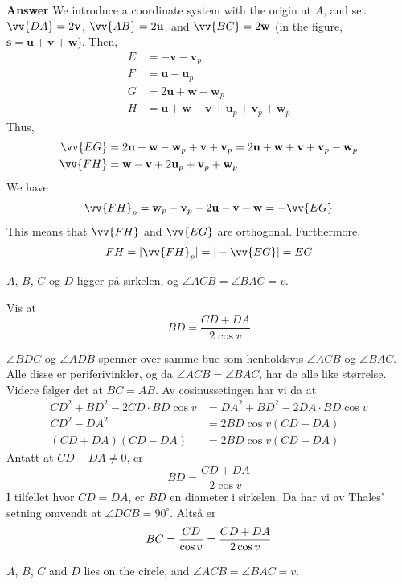 \documentclass[english,oneside, hidelinks, 11 pt, class=report,crop=false]{standalone}
\begin{document}
\textbf{Answer}
We introduce a coordinate system with the origin at $A$, and set $\vv{DA} = 2\textbf{v}$, $\vv{AB} = 2\textbf{u}$, and $\vv{BC} = 2\textbf{w}$ (in the figure, $\textbf{s} = \textbf{u} + \textbf{v} + \textbf{w}$). Then,
\begin{align*}
	E &= -\textbf{v} - \textbf{v}_p \\
	F &= \textbf{u} - \textbf{u}_p \\
	G &= 2\textbf{u} + \textbf{w} - \textbf{w}_p \\
	H &= \textbf{u} + \textbf{w} - \textbf{v} + \textbf{u}_p + \textbf{v}_p + \textbf{w}_p
\end{align*}
Thus,
\begin{align*}
	\vv{EG} &= 2\textbf{u} + \textbf{w} - \textbf{w}_p + \textbf{v} + \textbf{v}_p = 2\textbf{u} + \textbf{w} + \textbf{v} + \textbf{v}_p - \textbf{w}_p \\
	\vv{FH} &= \textbf{w} - \textbf{v} + 2\textbf{u}_p + \textbf{v}_p + \textbf{w}_p
\end{align*}
We have
\[
\vv{FH}_p = \textbf{w}_p - \textbf{v}_p - 2\textbf{u} - \textbf{v} - \textbf{w} = -\vv{EG}
\]
This means that $\vv{FH}$ and $\vv{EG}$ are orthogonal. Furthermore,
\[ FH = |\vv{FH}_p| = |-\vv{EG}| = EG \]

\newpage
$A$, $B$, $C$ og $D$ ligger på sirkelen, og $\angle ACB=\angle BAC=v$.\os

Vis at 
\[ BD = \frac{CD+DA}{2\cos v} \] 

\sv
$\angle BDC$ og $\angle ADB$ spenner over samme bue som henholdsvis $\angle ACB$ og $\angle BAC$. Alle disse er periferivinkler, og da $\angle ACB=\angle BAC$, har de alle like størrelse. Videre følger det at $BC=AB$. Av cosinussetingen har vi da at
\begin{align*}
	CD^2+BD^2-2CD\cdot BD\cos v &= DA^2+BD^2-2DA\cdot BD\cos v \\
	CD^2-DA^2 &= 2BD\cos v(CD-DA) \\
	(CD+DA)(CD-DA)&= 2BD\cos v(CD-DA)
\end{align*}
Antatt at $CD-DA\neq0$, er 
\[ BD=\frac{CD+DA}{2\cos v} \]
I tilfellet hvor ${CD=DA}$, er $BD$ en diameter i sirkelen. Da har vi av Thales' setning omvendt at $\angle DCB=90^\circ$. Altså er
\begin{align*}
	BC &= \frac{CD}{\cos v}  = \frac{CD+DA}{2\cos v} \br
\end{align*}
\newpage
$A$, $B$, $C$ and $D$ lies on the circle, and
$\angle ACB=\angle BAC=v$.\os 
\end{document}
